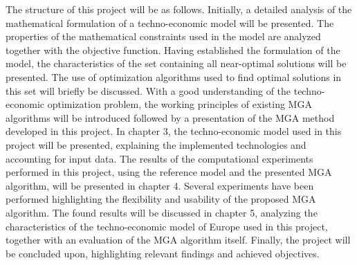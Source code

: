 The structure of this project will be as follows. Initially, a detailed analysis of the mathematical formulation of a techno-economic model will be presented. The properties of the mathematical constraints used in the model are analyzed together with the objective function. Having established the formulation of the model, the characteristics of the set containing all near-optimal solutions will be presented. The use of optimization algorithms used to find optimal solutions in this set will briefly be discussed. With a good understanding of the techno-economic optimization problem, the working principles of existing MGA algorithms will be introduced followed by a presentation of the MGA method developed in this project. 
In chapter 3, the techno-economic model used in this project will be presented, explaining the implemented technologies and accounting for input data. The results of the computational experiments performed in this project, using the reference model and the presented MGA algorithm, will be presented in chapter 4. Several experiments have been performed highlighting the flexibility and usability of the proposed MGA algorithm. The found results will be discussed in chapter 5, analyzing the characteristics of the techno-economic model of Europe used in this project, together with an evaluation of the MGA algorithm itself. Finally, the project will be concluded upon, highlighting relevant findings and achieved objectives. 




